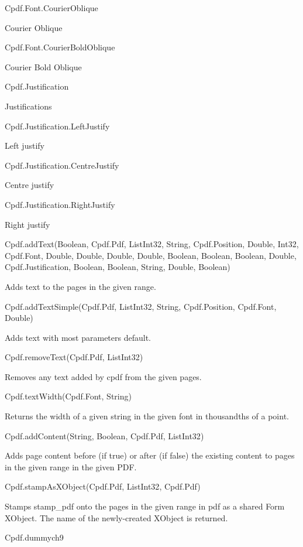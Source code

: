 Cpdf.Font.CourierOblique

Courier Oblique

Cpdf.Font.CourierBoldOblique

Courier Bold Oblique

Cpdf.Justification

Justifications

Cpdf.Justification.LeftJustify

Left justify

Cpdf.Justification.CentreJustify

Centre justify

Cpdf.Justification.RightJustify

Right justify

Cpdf.addText(Boolean, Cpdf.Pdf, List{Int32}, String, Cpdf.Position, Double, Int32, Cpdf.Font, Double, Double, Double, Double, Boolean, Boolean, Boolean, Double, Cpdf.Justification, Boolean, Boolean, String, Double, Boolean)

Adds text to the pages in the given range.

Cpdf.addTextSimple(Cpdf.Pdf, List{Int32}, String, Cpdf.Position, Cpdf.Font, Double)

Adds text with most parameters default.

Cpdf.removeText(Cpdf.Pdf, List{Int32})

Removes any text added by cpdf from the
given pages.

Cpdf.textWidth(Cpdf.Font, String)

Returns the width of a given string in the given font in thousandths of a
point.

Cpdf.addContent(String, Boolean, Cpdf.Pdf, List{Int32})

Adds page content before (if
true) or after (if false) the existing content to pages in the given range
in the given PDF.

Cpdf.stampAsXObject(Cpdf.Pdf, List{Int32}, Cpdf.Pdf)

Stamps stamp_pdf onto the pages
in the given range in pdf as a shared Form XObject. The name of the
newly-created XObject is returned.

Cpdf.dummych9

